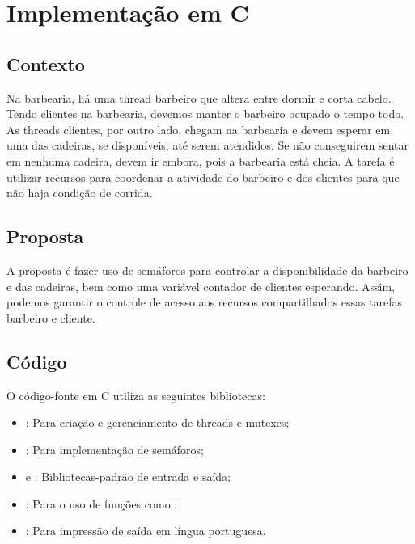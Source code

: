 \documentclass[
	12pt,				%
	openright,			%
	oneside,			%
	a4paper,			%
	chapter=TITLE,		%
	english,			%
	french,				%
	spanish,			%
	brazil				%
	]{abntex2}
\theoremstyle{definition}
\begin{document}
\section{Implementação em C}
\subsection{Contexto}
Na barbearia, há uma thread barbeiro que altera entre dormir e corta cabelo. Tendo clientes na barbearia, devemos manter o barbeiro ocupado o tempo todo. As threads clientes, por outro lado, chegam na barbearia e devem esperar em uma das cadeiras, se disponíveis, até serem atendidos. Se não conseguirem sentar em nenhuma cadeira, devem ir embora, pois a barbearia está cheia. A tarefa é utilizar recursos para coordenar a atividade do barbeiro e dos clientes para que não haja condição de corrida.

\subsection{Proposta}
A proposta é fazer uso de semáforos para controlar a disponibilidade da barbeiro e das cadeiras, bem como uma variável contador de clientes esperando. Assim, podemos garantir o controle de acesso aos recursos compartilhados essas tarefas barbeiro e cliente.

\subsection{Código}
O código-fonte em C utiliza as seguintes bibliotecas:
\begin{itemize}
    \item \textbf{}: Para criação e gerenciamento de threads e mutexes;
    \item \textbf{}: Para implementação de semáforos;
    \item \textbf{} e \textbf{}: Bibliotecas-padrão de entrada e saída;
    \item \textbf{}: Para o uso de funções como ;
    \item \textbf{}: Para impressão de saída em língua portuguesa.
\end{itemize}
\end{document}
